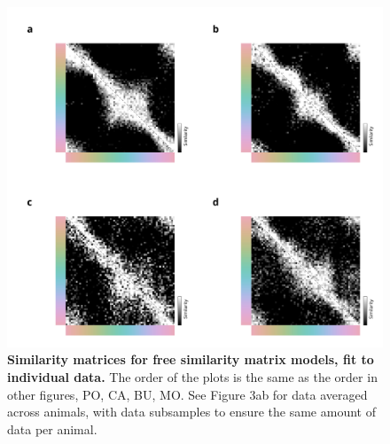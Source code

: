 \begin{figure}
    \centering
    \begin{fullwidth}
    \includegraphics[width=\textwidth+4cm]{../Figures/flat/SI5_IndTCCv.jpg}
    \caption{\textbf{Similarity matrices for free similarity matrix models, fit to individual data.}
    The order of the plots is the same as the order in other figures, PO, CA, BU, MO. See Figure 3ab for data averaged across animals, with data subsamples to ensure the same amount of data per animal.
    } 
    \label{fig:IndiTCC}
    \end{fullwidth}
\end{figure}

